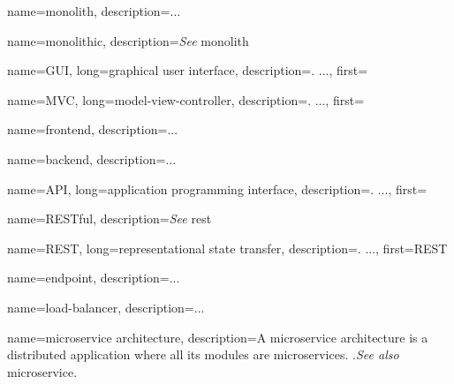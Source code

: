 




{
    name=monolith,
    description={...} %
}
    
{
    name=monolithic,
    description={\textit{See} \gls{monolith}}
}
    
{
    name=GUI,
    long={graphical user interface},
    description={. ...},%
    first=
}

{
    name=MVC,
    long={model-view-controller},
    description={. ...},
    first=
}

{
    name=frontend,
    description={...} %
}

{
    name=backend,
    description={...} %
}

{
    name=API,
    long={application programming interface},
    description={. ...},%
    first=
}

{
    name=RESTful,
    description={\textit{See} \gls{rest}}
}

{
    name=REST,
    long={representational state transfer},
    description={. ...},%
    first=REST %
}

{
    name=endpoint,
    description={...} %
}

{
    name=load-balancer,
    description={...} %
}

{
    name=microservice architecture,
    description={A microservice architecture is a distributed application where
    all its modules are microservices. \autocite{Dragoni_etal_2017}.\textit{See
    also} \gls{microservice}.} %
}


